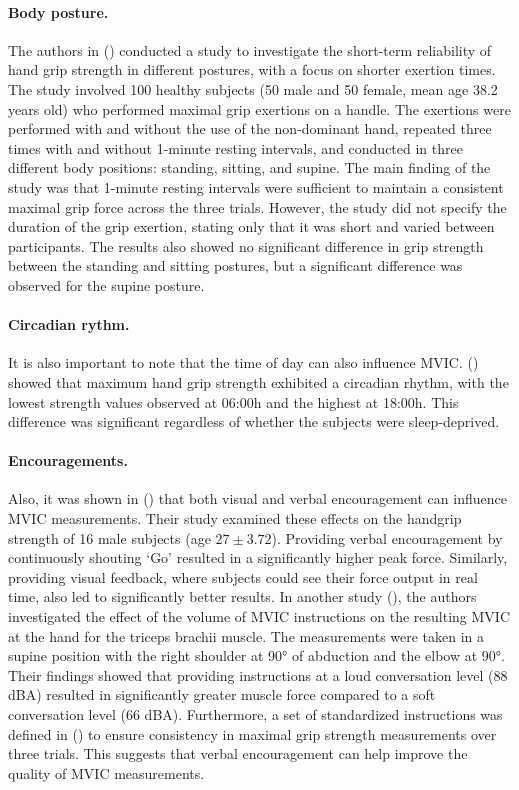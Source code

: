 \paragraph*{Body posture.} The authors in (\cite{watanabeShortTermReliabilityGrip2005}) conducted a study to investigate the short-term reliability of hand grip strength in different postures, with a focus on shorter exertion times. The study involved 100 healthy subjects (50 male and 50 female, mean age 38.2 years old) who performed maximal grip exertions on a handle. The exertions were performed with and without the use of the non-dominant hand, repeated three times with and without 1-minute resting intervals, and conducted in three different body positions: standing, sitting, and supine. The main finding of the study was that 1-minute resting intervals were sufficient to maintain a consistent maximal grip force across the three trials. However, the study did not specify the duration of the grip exertion, stating only that it was short and varied between participants. The results also showed no significant difference in grip strength between the standing and sitting postures, but a significant difference was observed for the supine posture.

\paragraph*{Circadian rythm.} It is also important to note that the time of day can also influence MVIC. (\cite{jasperCircadianVariationsKinematics2009}) showed that maximum hand grip strength exhibited a circadian rhythm, with the lowest strength values observed at 06:00h and the highest at 18:00h. This difference was significant regardless of whether the subjects were sleep-deprived.

\paragraph*{Encouragements.} Also, it was shown in (\cite{jungEffectsInstructionVerbal1999}) that both visual and verbal encouragement can influence MVIC measurements. Their study examined these effects on the handgrip strength of 16 male subjects (age $27\pm 3.72$). Providing verbal encouragement by continuously shouting `Go' resulted in a significantly higher peak force. Similarly, providing visual feedback, where subjects could see their force output in real time, also led to significantly better results. In another study (\cite{johanssonRelationshipVerbalCommand1983a}), the authors investigated the effect of the volume of MVIC instructions on the resulting MVIC at the hand for the triceps brachii muscle. The measurements were taken in a supine position with the right shoulder at 90° of abduction and the elbow at 90°. Their findings showed that providing instructions at a loud conversation level (88 dBA) resulted in significantly greater muscle force compared to a soft conversation level (66 dBA). Furthermore, a set of standardized instructions was defined in (\cite{mathiowetzReliabilityValidityGrip1984a}) to ensure consistency in maximal grip strength measurements over three trials. This suggests that verbal encouragement can help improve the quality of MVIC measurements.

